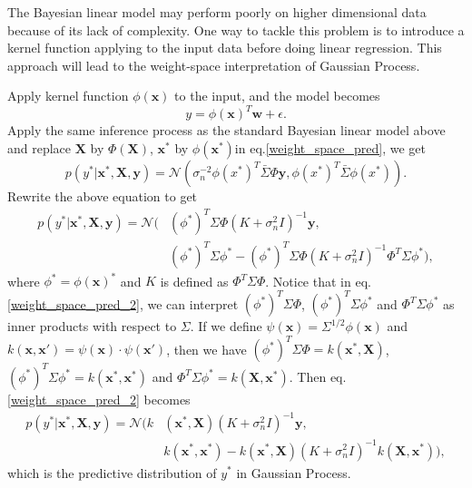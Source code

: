 \documentclass[11pt,a4paper]{article}
\theoremstyle{definition}
\numberwithin{equation}{section}
\let\vec\mathbf
\begin{document}
	The Bayesian linear model may perform poorly on higher dimensional data because of its  lack of complexity. One way to tackle this problem is to introduce a kernel function applying to the input data before doing linear regression. This approach will lead to the weight-space interpretation of Gaussian Process.
	
	Apply kernel function $\phi(\vec x)$ to the input, and the model becomes
	\begin{equation}
	y = \phi(\vec x)^T\vec w + \epsilon.
	\end{equation}
	Apply the same inference process as the standard Bayesian linear model above and replace $\vec X$ by $\Phi(\vec X)$, $\vec x^*$ by $\phi(\vec x^*)$in eq.\ref{weight_space_pred}, we get
	\begin{equation}
	p(y^*|\vec x^*,\vec X, \vec y) =\mathcal N\left(\sigma^{-2}_n\phi(x^*)^{T}\bar\Sigma\Phi \vec y,\phi(x^*)^{T}\bar\Sigma\phi(x^*)\right).
	\end{equation}
	Rewrite the above equation to get
	\begin{equation}\label{weight_space_pred_2}
	\begin{split}
	p(y^*|\vec x^*,\vec X, \vec y) =\mathcal N( &(\phi^*)^T\Sigma\Phi(K+\sigma^2_nI)^{-1}\vec y,\\
	&(\phi^*)^T\Sigma\phi^*- (\phi^*)^T\Sigma\Phi(K+\sigma^2_nI)^{-1}\Phi^T\Sigma \phi^*),
	\end{split}
	\end{equation}
	where $\phi^*=\phi(\vec x)^*$ and $K$ is defined as $\Phi^T\Sigma\Phi$.
	Notice that in eq.\ref{weight_space_pred_2}, we can interpret $(\phi^*)^T\Sigma\Phi$, $(\phi^*)^T\Sigma\phi^*$ and $\Phi^T\Sigma \phi^*$ as inner products with respect to $\Sigma$. If we define $\psi(\vec x) = \Sigma^{1/2}\phi(\vec x)$ and $k(\vec x,\vec x')=\psi(\vec x) \cdot \psi(\vec x') $, then we have $(\phi^*)^T\Sigma\Phi = k(\vec x^*,\vec X)$, $(\phi^*)^T\Sigma\phi^* = k(\vec x^*,\vec x^*)$ and $\Phi^T\Sigma \phi^* = k(\vec X,\vec x^*)$. Then eq. \ref{weight_space_pred_2} becomes
	\begin{equation}
	\begin{split}
	p(y^*|\vec x^*,\vec X, \vec y) =\mathcal N(k&(\vec x^*,\vec X)(K+\sigma^2_nI)^{-1}\vec y,\\
	&k(\vec x^*,\vec x^*)- k(\vec x^*,\vec X)(K+\sigma^2_nI)^{-1}k(\vec X,\vec x^*)),
	\end{split}
	\end{equation}
	which is the predictive distribution of $y^*$ in Gaussian Process. 
	
\end{document}
